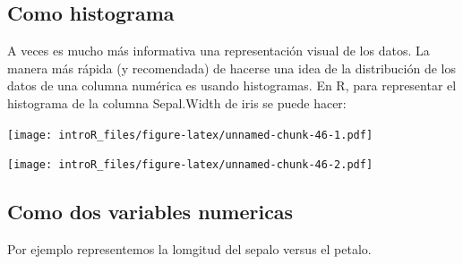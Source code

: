 \documentclass[
]{book}
\newenvironment{Shaded}{\begin{snugshade}}{\end{snugshade}}
\newcommand{\CommentTok}[1]{\textcolor[rgb]{0.56,0.35,0.01}{\textit{#1}}}
\newcommand{\DataTypeTok}[1]{\textcolor[rgb]{0.13,0.29,0.53}{#1}}
\newcommand{\KeywordTok}[1]{\textcolor[rgb]{0.13,0.29,0.53}{\textbf{#1}}}
\newcommand{\NormalTok}[1]{#1}
\newcommand{\OperatorTok}[1]{\textcolor[rgb]{0.81,0.36,0.00}{\textbf{#1}}}
\newcommand{\StringTok}[1]{\textcolor[rgb]{0.31,0.60,0.02}{#1}}
\begin{document}
\hypertarget{como-histograma}{%
\subsection{Como histograma}\label{como-histograma}}

A veces es mucho más informativa una representación visual de los datos. La manera más rápida (y recomendada) de hacerse una idea de la distribución de los datos de una columna numérica es usando histogramas. En R, para representar el histograma de la columna Sepal.Width de iris se puede hacer:

\begin{Shaded}
\end{Shaded}

\texttt{[image: introR\_files/figure-latex/unnamed-chunk-46-1.pdf]}

\begin{Shaded}
\end{Shaded}

\texttt{[image: introR\_files/figure-latex/unnamed-chunk-46-2.pdf]}

\hypertarget{como-dos-variables-numericas}{%
\subsection{Como dos variables numericas}\label{como-dos-variables-numericas}}

Por ejemplo representemos la lomgitud del sepalo versus el petalo.

\begin{Shaded}
\end{Shaded}
\end{document}
